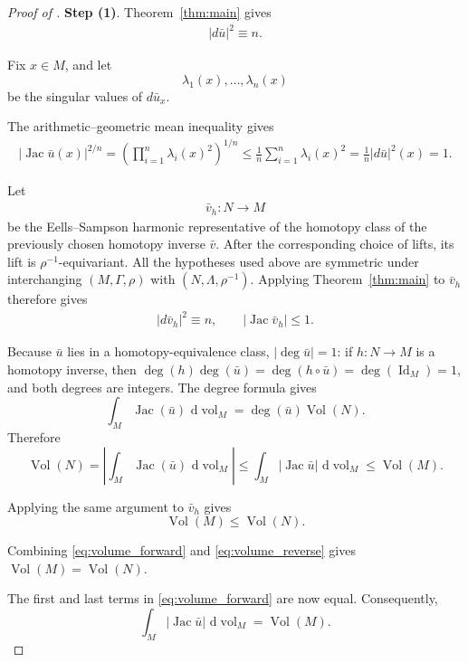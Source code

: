\documentclass[11pt]{amsart}
\theoremstyle{plain}
\theoremstyle{plain}
\theoremstyle{plain}
\newcommand{\Jac}{\operatorname{Jac}}
\newcommand{\Vol}{\operatorname{Vol}}
\newcommand{\Id}{\operatorname{Id}}
\newcommand{\dd}{\,\mathrm{d}}
\numberwithin{equation}{section}
\begin{document}
\begin{proof}[Proof of ]
\textbf{Step (1)}. Theorem~\ref{thm:main} gives
\begin{align}
|d\bar u|^2\equiv n.\label{gradient-u-equality}
\end{align}

Fix \(x\in M\), and let
\[
\lambda_1(x),\dots,\lambda_n(x)
\]
be the singular values of \(d\bar u_x\).  

The arithmetic--geometric mean inequality gives
\begin{align}
|\Jac\bar u(x)|^{2/n}
=
\left(\prod_{i=1}^n\lambda_i(x)^2\right)^{1/n}
\leq
\frac1n\sum_{i=1}^n\lambda_i(x)^2
= \frac{1}{n}|d\bar u|^2(x)= 1.
\label{eq:jac_bounds_both}
\end{align}

Let
\begin{align}
\bar v_h:N\longrightarrow M
\nonumber
\end{align}
be the Eells--Sampson harmonic representative of the homotopy class of the
previously chosen homotopy inverse \(\bar v\).  After the corresponding
choice of lifts, its lift is \(\rho^{-1}\)-equivariant.  All the hypotheses
used above are symmetric under interchanging
\((M,\Gamma,\rho)\) with \((N,\Lambda,\rho^{-1})\).  Applying
Theorem~\ref{thm:main} to \(\bar v_h\) therefore gives
\begin{align}
|d\bar v_h|^2\equiv n,
\qquad
|\Jac\bar v_h|\leq1.
\nonumber
\end{align}

Because \(\bar u\) lies in a homotopy-equivalence class,
\(|\deg\bar u|=1\): if \(h:N\to M\) is a homotopy inverse, then
\(\deg(h)\deg(\bar u)=\deg(h\circ\bar u)=\deg(\Id_M)=1\), and both
degrees are integers.  The degree formula gives
\[
\int_M\Jac(\bar u)\,\dd\operatorname{vol}_M
=
\deg(\bar u)\Vol(N).
\]
Therefore
\begin{equation}\label{eq:volume_forward}
\Vol(N)
=
\left|\int_M\Jac(\bar u)\,\dd\operatorname{vol}_M\right|
\leq
\int_M|\Jac\bar u|\,\dd\operatorname{vol}_M
\leq
\Vol(M).
\end{equation}

Applying the same argument to \(\bar v_h\) gives
\begin{equation}\label{eq:volume_reverse}
\Vol(M)\leq\Vol(N).
\end{equation}

Combining \eqref{eq:volume_forward} and
\eqref{eq:volume_reverse} gives $\Vol(M)=\Vol(N)$.

The first and last terms in \eqref{eq:volume_forward} are now equal.
Consequently,
\[
\int_M|\Jac\bar u|\,\dd\operatorname{vol}_M=\Vol(M).
\]


\end{proof}
\end{document}
